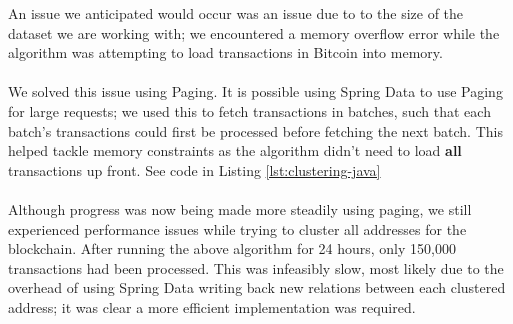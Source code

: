 An issue we anticipated would occur was an issue due to to the size of the dataset we are working with; we encountered a memory overflow error while the algorithm was attempting to load transactions in Bitcoin into memory. 
\\\\
We solved this issue using Paging. It is possible using Spring Data to use Paging for large requests; we used this to fetch transactions in batches, such that each batch's transactions could first be processed before fetching the next batch. This helped tackle memory constraints as the algorithm didn't need to load \textbf{all} transactions up front. See code in Listing \ref{lst:clustering-java}
\\\\
Although progress was now being made more steadily using paging, we still experienced performance issues while trying to cluster all addresses for the blockchain. After running the above algorithm for 24 hours, only 150,000 transactions had been processed. This was infeasibly slow, most likely due to the overhead of using Spring Data writing back new relations between each clustered address; it was clear a more efficient implementation was required.
\\\\

